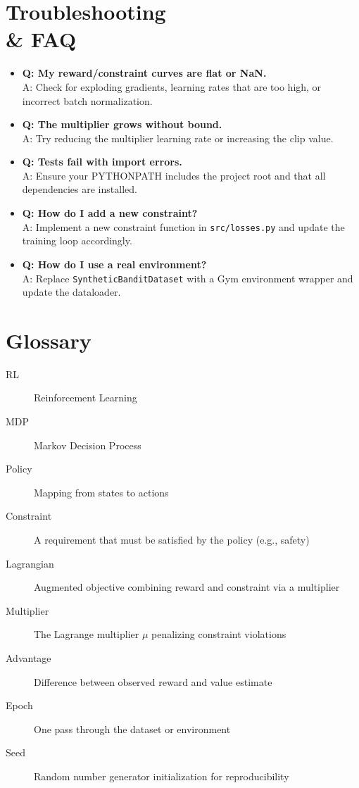 \section{Troubleshooting \\& FAQ}
\begin{itemize}
  \item \textbf{Q: My reward/constraint curves are flat or NaN.} \\A: Check for exploding gradients, learning rates that are too high, or incorrect batch normalization.
  \item \textbf{Q: The multiplier grows without bound.} \\A: Try reducing the multiplier learning rate or increasing the clip value.
  \item \textbf{Q: Tests fail with import errors.} \\A: Ensure your PYTHONPATH includes the project root and that all dependencies are installed.
  \item \textbf{Q: How do I add a new constraint?} \\A: Implement a new constraint function in \texttt{src/losses.py} and update the training loop accordingly.
  \item \textbf{Q: How do I use a real environment?} \\A: Replace \texttt{SyntheticBanditDataset} with a Gym environment wrapper and update the dataloader.
\end{itemize}

\section{Glossary}
\begin{description}
  \item[RL] Reinforcement Learning
  \item[MDP] Markov Decision Process
  \item[Policy] Mapping from states to actions
  \item[Constraint] A requirement that must be satisfied by the policy (e.g., safety)
  \item[Lagrangian] Augmented objective combining reward and constraint via a multiplier
  \item[Multiplier] The Lagrange multiplier $\mu$ penalizing constraint violations
  \item[Advantage] Difference between observed reward and value estimate
  \item[Epoch] One pass through the dataset or environment
  \item[Seed] Random number generator initialization for reproducibility
\end{description}

